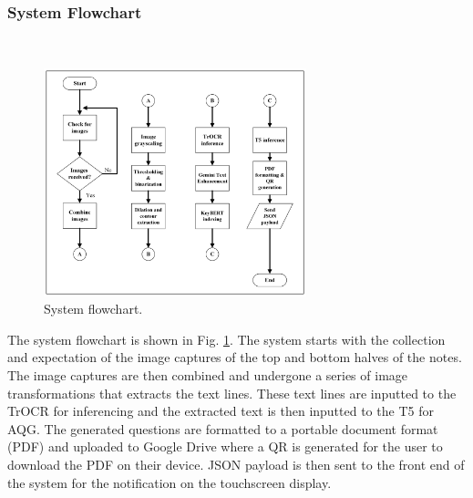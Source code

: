 \documentclass[conference]{IEEEtran}
\begin{document}
        \subsubsection{System Flowchart}
            \hfill \\
            \begin{figure}[H]
                \centerline{\includegraphics[width=3in]{flowchart.png}}
                \vspace{-0.4cm}
                \caption{System flowchart.} 
                \label{flowchart}
            \end{figure}
            \indent The system flowchart is shown in 
           Fig. \ref{flowchart}. The system 
           starts with the collection and expectation of 
           the image captures of the top and bottom halves 
           of the notes. The image captures are then
           combined and undergone a series of image 
           transformations that extracts the text lines. 
           These text lines are inputted to the TrOCR for 
           inferencing and the extracted text is then
           inputted to the T5 for AQG. The generated
           questions are formatted to a portable document
              format (PDF) and uploaded to Google Drive 
            where a QR is generated for the user to download 
            the PDF on their device. JSON payload is then sent 
            to the front end of the system for the 
            notification on the touchscreen display.
        \vspace{0.4cm}
\end{document}
